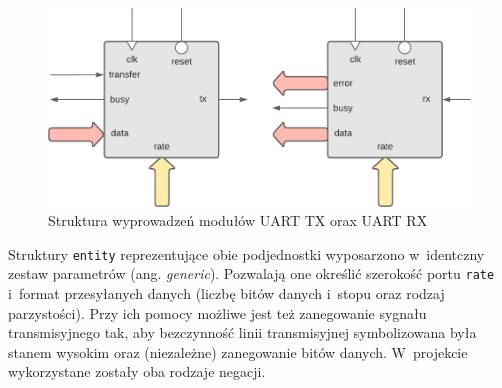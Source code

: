 \vspace{0.5cm}
\begin{figure}[ht]
    \centering
    \includegraphics[scale=0.75]{img/diagrams/uart.pdf}
    \captionsetup{format=plain,justification=centering}
    \caption{Struktura wyprowadzeń modułów UART TX orax UART RX}
    \label{uart-structure}
\end{figure}
\vspace{0.5cm}

Struktury \verb|entity| reprezentujące obie podjednostki wyposarzono w~identczny zestaw parametrów (ang. \textit{generic}). Pozwalają one określić szerokość portu \verb|rate| i~format przesyłanych danych (liczbę bitów danych i~stopu oraz rodzaj parzystości). Przy ich pomocy możliwe jest też zanegowanie sygnału transmisyjnego tak, aby bezczynność linii transmisyjnej symbolizowana była stanem wysokim oraz (niezależne) zanegowanie bitów danych. W~projekcie wykorzystane zostały oba rodzaje negacji. 


